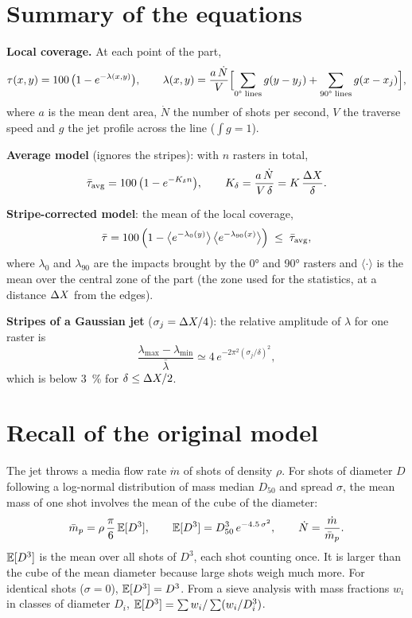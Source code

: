 \documentclass[11pt,a4paper]{article}
\begin{document}
\section{Summary of the equations}

\begin{keybox}
\textbf{Local coverage.} At each point of the part,
\begin{equation}
\tau(x,y)=100\,\bigl(1-e^{-\lambda(x,y)}\bigr),\qquad
\lambda(x,y)=\frac{a\,\dot N}{V}\Bigl[\sum_{\text{0° lines}} g(y-y_j)+\sum_{\text{90° lines}} g(x-x_j)\Bigr],
\label{eq:lambda}
\end{equation}
where $a$ is the mean dent area, $\dot N$ the number of shots per second, $V$ the traverse speed and $g$ the jet profile across the line ($\int g=1$).

\smallskip
\textbf{Average model} (ignores the stripes): with $n$ rasters in total,
\begin{equation}
\bar\tau_{\text{avg}}=100\,\bigl(1-e^{-K_\delta n}\bigr),\qquad K_\delta=\frac{a\,\dot N}{V\,\delta}=K\,\frac{\Delta X}{\delta}.
\label{eq:avg}
\end{equation}

\textbf{Stripe-corrected model}: the mean of the local coverage,
\begin{equation}
\bar\tau=100\,\Bigl(1-\bigl\langle e^{-\lambda_{0}(y)}\bigr\rangle\,\bigl\langle e^{-\lambda_{90}(x)}\bigr\rangle\Bigr)\;\le\;\bar\tau_{\text{avg}},
\label{eq:corr}
\end{equation}
where $\lambda_0$ and $\lambda_{90}$ are the impacts brought by the 0° and 90° rasters and $\langle\cdot\rangle$ is the mean over the central zone of the part (the zone used for the statistics, at a distance $\Delta X$ from the edges).

\smallskip
\textbf{Stripes of a Gaussian jet} ($\sigma_j=\Delta X/4$): the relative amplitude of $\lambda$ for one raster is
\begin{equation}
\frac{\lambda_{\max}-\lambda_{\min}}{\bar\lambda}\simeq 4\,e^{-2\pi^2(\sigma_j/\delta)^2},
\end{equation}
which is below \SI{3}{\percent} for $\delta\le\Delta X/2$.
\end{keybox}

\section{Recall of the original model}\label{sec:recall}

The jet throws a media flow rate $\dot m$ of shots of density $\rho$. For shots of diameter $D$ following a log-normal distribution of mass median $D_{50}$ and spread $\sigma$, the mean mass of one shot involves the mean of the cube of the diameter:
\begin{equation}
\bar m_p=\rho\,\frac{\pi}{6}\,\mathbb{E}[D^3],\qquad \mathbb{E}[D^3]=D_{50}^3\,e^{-4.5\,\sigma^2},\qquad \dot N=\frac{\dot m}{\bar m_p}.
\end{equation}
$\mathbb{E}[D^3]$ is the mean over all shots of $D^3$, each shot counting once. It is larger than the cube of the mean diameter because large shots weigh much more. For identical shots ($\sigma=0$), $\mathbb{E}[D^3]=D^3$. From a sieve analysis with mass fractions $w_i$ in classes of diameter $D_i$, $\mathbb{E}[D^3]=\sum w_i/\sum(w_i/D_i^3)$.
\end{document}
